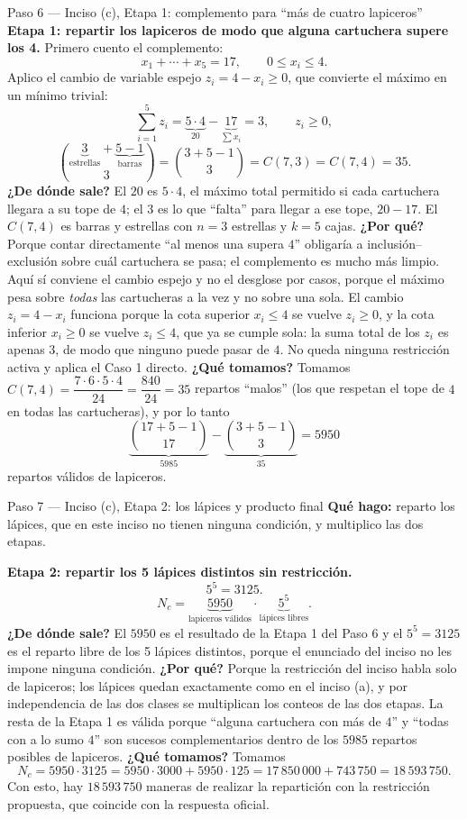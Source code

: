 \documentclass[11pt]{article}
\begin{document}
\begin{sol}
\begin{paso}{Paso 6 --- Inciso (c), Etapa 1: complemento para ``más de cuatro lapiceros''}
\medskip
\textbf{Etapa 1: repartir los lapiceros de modo que alguna cartuchera supere los 4.}
Primero cuento el complemento:
\[
x_1+\cdots+x_5=17,\qquad 0\le x_i\le 4 .
\]
Aplico el cambio de variable espejo $z_i=4-x_i\ge 0$, que convierte el máximo en un mínimo trivial:
\[
\sum_{i=1}^{5}z_i=\underbrace{5\cdot 4}_{20}-\underbrace{17}_{\sum x_i}=3,\qquad z_i\ge 0 ,
\]
\[
\binom{\underbrace{3}_{\text{estrellas}}+\underbrace{5-1}_{\text{barras}}}{3}=\binom{3+5-1}{3}=C(7,3)=C(7,4)=35 .
\]
\textbf{¿De dónde sale?} El $20$ es $5\cdot 4$, el máximo total permitido si cada cartuchera llegara a su tope de $4$; el $3$ es lo que ``falta'' para llegar a ese tope, $20-17$. El $C(7,4)$ es barras y estrellas con $n=3$ estrellas y $k=5$ cajas.
\textbf{¿Por qué?} Porque contar directamente ``al menos una supera $4$'' obligaría a inclusión--exclusión sobre cuál cartuchera se pasa; el complemento es mucho más limpio. Aquí sí conviene el cambio espejo y no el desglose por casos, porque el máximo pesa sobre \emph{todas} las cartucheras a la vez y no sobre una sola. El cambio $z_i=4-x_i$ funciona porque la cota superior $x_i\le 4$ se vuelve $z_i\ge 0$, y la cota inferior $x_i\ge0$ se vuelve $z_i\le 4$, que ya se cumple sola: la suma total de los $z_i$ es apenas $3$, de modo que ninguno puede pasar de $4$. No queda ninguna restricción activa y aplica el Caso 1 directo.
\textbf{¿Qué tomamos?} Tomamos $C(7,4)=\dfrac{7\cdot 6\cdot 5\cdot 4}{24}=\dfrac{840}{24}=35$ repartos ``malos'' (los que respetan el tope de $4$ en todas las cartucheras), y por lo tanto
\[
\underbrace{\binom{17+5-1}{17}}_{5985}-\underbrace{\binom{3+5-1}{3}}_{35}=5950
\]
repartos válidos de lapiceros.
\end{paso}

\begin{paso}{Paso 7 --- Inciso (c), Etapa 2: los lápices y producto final}
\textbf{Qué hago:} reparto los lápices, que en este inciso no tienen ninguna condición, y multiplico las dos etapas.

\medskip
\textbf{Etapa 2: repartir los 5 lápices distintos sin restricción.}
\[
5^5=3125 .
\]
\[
N_c=\underbrace{5950}_{\text{lapiceros válidos}}\cdot\underbrace{5^5}_{\text{lápices libres}} .
\]
\textbf{¿De dónde sale?} El $5950$ es el resultado de la Etapa 1 del Paso 6 y el $5^5=3125$ es el reparto libre de los 5 lápices distintos, porque el enunciado del inciso no les impone ninguna condición.
\textbf{¿Por qué?} Porque la restricción del inciso habla solo de lapiceros; los lápices quedan exactamente como en el inciso (a), y por independencia de las dos clases se multiplican los conteos de las dos etapas. La resta de la Etapa 1 es válida porque ``alguna cartuchera con más de $4$'' y ``todas con a lo sumo $4$'' son sucesos complementarios dentro de los $5985$ repartos posibles de lapiceros.
\textbf{¿Qué tomamos?} Tomamos
\[
N_c=5950\cdot 3125=5950\cdot 3000+5950\cdot 125=17\,850\,000+743\,750=18\,593\,750 .
\]
Con esto, hay $18\,593\,750$ maneras de realizar la repartición con la restricción propuesta, que coincide con la respuesta oficial.
\end{paso}

\end{sol}
\end{document}
